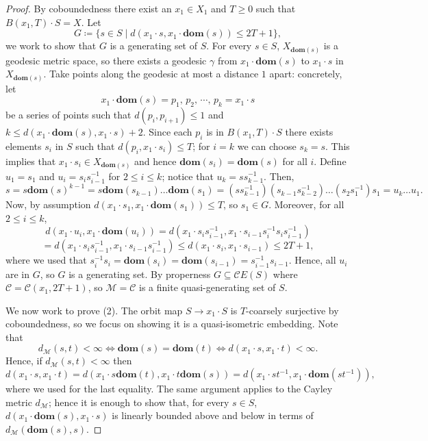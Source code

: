 \documentclass[10pt,a4paper]{amsart}
\newcommand{\dom}[1]{\mathbf{dom}\left(#1\right)}
\begin{document}
\begin{proof}
	By coboundedness there exist an 
    $x_1 \in X_1$ and $T\ge 0$ such that $B(x_1,T) \cdot S = X$. Let $$G \coloneq \{ s \in S \mid d(x_1 \cdot s, x_1\cdot \dom{s})\le 2T+1\},$$ we work to show that $G$ is a generating set of $S$. For every $s \in S$, $X_{\dom{s}}$ is a geodesic metric space, so there exists a geodesic
	$\gamma$ from $x_1 \cdot \dom{s}$ to $x_1 \cdot s$ in  $X_{\dom{s}}$.
    Take points along the geodesic at most a distance $1$ apart: concretely,
    let $$x_1 \cdot \dom{s} = p_1, \,p_2,\, \cdots,\, p_k = x_1 \cdot s$$
    be a series of points
    such that $d(p_i,p_{i+1}) \leq 1$ and $k \leq d(x_1 \cdot \dom{s}, x_1 \cdot s) + 2$.
    Since each $p_{i}$ is in $B(x_1,T) \cdot S$ there exists elements $s_{i}$ in $S$ 
	such that $d(p_{i}, x_1 \cdot s_{i}) \leq T$; for $i=k$ we can choose $s_k=s$. This implies that $x_1 \cdot s_i \in X_{\dom{s}}$ and hence
	$\dom{s_{i}} = \dom{s}$ for all $i$.
	Define $u_1 = s_1$ and $u_{i} = s_{i} s_{i-1}^{-1}$ for $2 \leq i \leq k$; notice that $u_k=ss_{k-1}^{-1}$. Then,
	\[
		s = s\dom{s}^{k-1}=s\dom{s_{k-1}}\ldots\dom{s_1}=(s s_{k-1}^{-1})(s_{k-1}s_{k-2}^{-1})\ldots (s_2s_1^{-1})s_1 = u_{k} \ldots u_{1}.
	\]
    Now, by assumption
    $d(x_1 \cdot s_1, x_1 \cdot \dom{s_1}) \leq T$, so $s_1\in G$. Moreover, for all $2 \leq i \leq k$,
	\[d(x_1 \cdot u_i, x_1 \cdot \dom{u_i}) = d(x_1 \cdot s_is_{i-1}^{-1}, x_1 \cdot s_{i-1}s_i^{-1}s_is_{i-1}^{-1})\]\[ =d(x_1 \cdot s_is_{i-1}^{-1}, x_1 \cdot s_{i-1}s_{i-1}^{-1}) \leq d(x_1\cdot  s_{i}, x_1 \cdot s_{i-1}) \leq 2T + 1,\]
	where we used that $s_i^{-1}s_i=\dom{s_i}=\dom{s_{i-1}}=s_{i-1}^{-1}s_{i-1}$. 
    Hence,  all $u_i$ are in $G$, so $G$ is a generating set.
    By properness $G \subseteq \mathcal{C}E(S)$ where $\mathcal{C}= \mathcal{C}(x_1, 2T+1)$, so
    $\mathcal{M} = \mathcal{C}$ is a finite quasi-generating set of $S$.

    We now work to prove (2). The orbit map $S\to x_1\cdot S$ is $T$-coarsely surjective by coboundedness, so we focus on showing it is a quasi-isometric embedding. Note that $$d_{\mathcal{M}}(s,t) < \infty \iff \dom{s}=\dom{t} \iff
    d(x_1 \cdot s, x_1 \cdot t) < \infty.$$ Hence, if $d_{\mathcal{M}}(s,t)<\infty$ then 
    \[d(x_1 \cdot s, x_1 \cdot t) =d(x_1 \cdot s\dom{t}, x_1 \cdot t\dom{s})= d(x_1 \cdot st^{-1}, x_1 \cdot \dom{st^{-1}}),\]
    where we used  for the last equality. The same argument applies to the Cayley metric $d_\mathcal{M}$; hence it is enough to show that, for every $s\in S$, $d(x_1\cdot \dom{s}, x_1\cdot s)$ is linearly bounded above and below in terms of $d_{\mathcal{M}}(\dom{s}, s)$. 
    

\end{proof}
\end{document}

